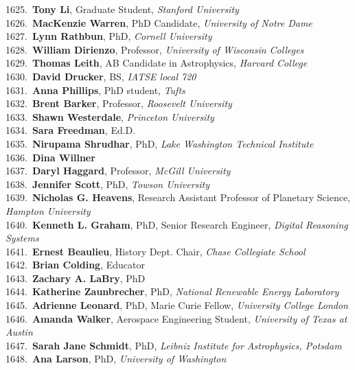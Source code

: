 1625.~{\bf Tony Li}, Graduate Student, {\sl Stanford University} \\
1626.~{\bf MacKenzie Warren}, PhD Candidate, {\sl University of Notre Dame} \\
1627.~{\bf Lynn Rathbun}, PhD, {\sl Cornell University} \\
1628.~{\bf William Dirienzo}, Professor, {\sl University of Wisconsin Colleges} \\
1629.~{\bf Thomas Leith}, AB Candidate in Astrophysics, {\sl Harvard College} \\
1630.~{\bf David Drucker}, BS, {\sl IATSE local 720} \\
1631.~{\bf Anna Phillips}, PhD student, {\sl Tufts} \\
1632.~{\bf Brent Barker}, Professor, {\sl Roosevelt University} \\
1633.~{\bf Shawn Westerdale}, {\sl Princeton University} \\
1634.~{\bf Sara Freedman}, Ed.D. \\
1635.~{\bf Nirupama Shrudhar}, PhD, {\sl Lake Washington Technical Institute} \\
1636.~{\bf Dina Willner} \\
1637.~{\bf Daryl Haggard}, Professor, {\sl McGill University} \\
1638.~{\bf Jennifer Scott}, PhD, {\sl Towson University} \\
1639.~{\bf Nicholas G. Heavens}, Research Assistant Professor of Planetary Science, {\sl Hampton University} \\
1640.~{\bf Kenneth L. Graham}, PhD, Senior Research Engineer, {\sl Digital Reasoning Systems} \\
1641.~{\bf Ernest Beaulieu}, History Dept. Chair, {\sl Chase Collegiate School} \\
1642.~{\bf Brian Colding}, Educator \\
1643.~{\bf Zachary A. LaBry}, PhD \\
1644.~{\bf Katherine Zaunbrecher}, PhD, {\sl National Renewable Energy Laboratory} \\
1645.~{\bf Adrienne Leonard}, PhD, Marie Curie Fellow, {\sl University College London} \\
1646.~{\bf Amanda Walker}, Aerospace Engineering Student, {\sl University of Texas at Austin} \\
1647.~{\bf Sarah Jane Schmidt}, PhD, {\sl Leibniz Institute for Astrophysics, Potsdam} \\
1648.~{\bf Ana Larson}, PhD, {\sl University of Washington} \\
